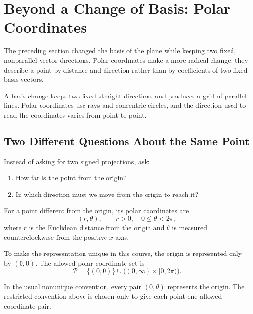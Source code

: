 \section{Beyond a Change of Basis: Polar Coordinates}

The preceding section changed the basis of the plane while keeping two fixed,
nonparallel vector directions. Polar coordinates make a more radical change:
they describe a point by distance and direction rather than by coefficients of
two fixed basis vectors.

\begin{corebox}
A basis change keeps two fixed straight directions and produces a grid of
parallel lines. Polar coordinates use rays and concentric circles, and the
direction used to read the coordinates varies from point to point.
\end{corebox}

\subsection*{Two Different Questions About the Same Point}

\begin{corebox}
Instead of asking for two signed projections, ask:
\begin{enumerate}
    \item How far is the point from the origin?
    \item In which direction must we move from the origin to reach it?
\end{enumerate}
\end{corebox}

\begin{definitionbox}
For a point different from the origin, its polar coordinates are
\[
\boxed{(r,\theta)},
\qquad
r>0,
\quad
0\leq\theta<2\pi,
\]
where $r$ is the Euclidean distance from the origin and $\theta$ is measured
counterclockwise from the positive $x$-axis.
\end{definitionbox}

\begin{definitionbox}
To make the representation unique in this course, the origin is represented only
by $(0,0)$. The allowed polar coordinate set is
\[
\boxed{
\mathcal P
=
\{(0,0)\}
\cup
\bigl((0,\infty)\times[0,2\pi)\bigr)
}.
\]
\end{definitionbox}

\begin{remarkbox}
In the usual nonunique convention, every pair $(0,\theta)$ represents the
origin. The restricted convention above is chosen only to give each point one
allowed coordinate pair.
\end{remarkbox}

